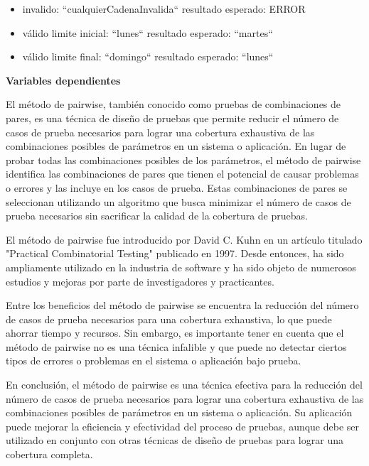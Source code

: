 \begin{itemize}
    \item invalido: “cualquierCadenaInvalida“ \rightarrow resultado esperado: ERROR
    \item válido limite inicial: “lunes“  \rightarrow resultado esperado: “martes“
    \item válido limite final: “domingo“  \rightarrow resultado esperado: “lunes“
\end{itemize}

\textbf{Variables dependientes}

El método de pairwise, también conocido como pruebas de combinaciones de pares, es una técnica de diseño de pruebas que permite reducir el número de casos de prueba necesarios para lograr una cobertura exhaustiva de las combinaciones posibles de parámetros en un sistema o aplicación. En lugar de probar todas las combinaciones posibles de los parámetros, el método de pairwise identifica las combinaciones de pares que tienen el potencial de causar problemas o errores y las incluye en los casos de prueba. Estas combinaciones de pares se seleccionan utilizando un algoritmo que busca minimizar el número de casos de prueba necesarios sin sacrificar la calidad de la cobertura de pruebas.

El método de pairwise fue introducido por David C. Kuhn en un artículo titulado \cite{37051} "Practical Combinatorial Testing" publicado en 1997. Desde entonces, ha sido ampliamente utilizado en la industria de software y ha sido objeto de numerosos estudios y mejoras por parte de investigadores y practicantes.

Entre los beneficios del método de pairwise se encuentra la reducción del número de casos de prueba necesarios para una cobertura exhaustiva, lo que puede ahorrar tiempo y recursos. Sin embargo, es importante tener en cuenta que el método de pairwise no es una técnica infalible y que puede no detectar ciertos tipos de errores o problemas en el sistema o aplicación bajo prueba.

En conclusión, el método de pairwise es una técnica efectiva para la reducción del número de casos de prueba necesarios para lograr una cobertura exhaustiva de las combinaciones posibles de parámetros en un sistema o aplicación. Su aplicación puede mejorar la eficiencia y efectividad del proceso de pruebas, aunque debe ser utilizado en conjunto con otras técnicas de diseño de pruebas para lograr una cobertura completa.

